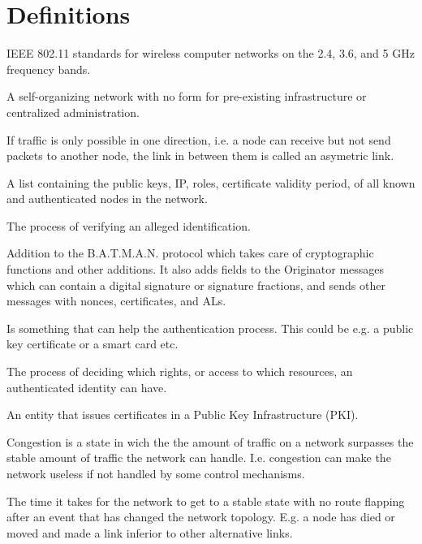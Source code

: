 \chapter*{Definitions}


\begin{acronym}

	IEEE 802.11 standards for wireless computer networks on the 2.4, 3.6, and 5 GHz
	frequency bands.

	A self-organizing network with no form for pre-existing infrastructure or
	centralized administration.

	If traffic is only possible in one direction, i.e. a node can receive but not
	send packets to another node, the link in between them is called an asymetric
	link.

	A list containing the public keys, IP, roles, certificate validity period,
	of all known and authenticated nodes in the network.

	The process of verifying an alleged identification.

	Addition to the B.A.T.M.A.N. protocol which takes care of cryptographic
	functions and other additions. It also adds fields to the Originator messages
	which can contain a digital signature or signature fractions, and sends other
	messages with nonces, certificates, and ALs.

	Is something that can help the authentication process. This could be e.g. a
	public key certificate or a smart card etc.

	The process of deciding which rights, or access to which resources, an
	authenticated identity can have.

	An entity that issues certificates in a Public Key Infrastructure (PKI).


	Congestion is a state in wich the the amount of traffic on a network surpasses
	the stable amount of traffic the network can handle. I.e. congestion can make
	the network useless if not handled by some control mechanisms.
	
	The time it takes for the network to get to a stable state with no route
	flapping after an event that has changed the network topology. E.g. a node has
	died or moved and made a link inferior to other alternative links.


\end{acronym}
